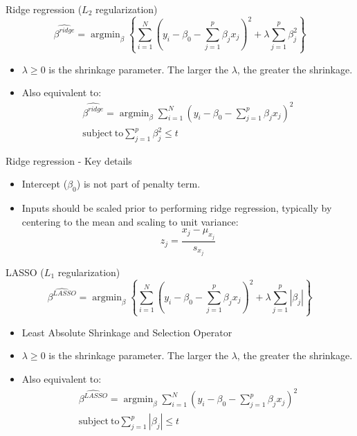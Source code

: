 \documentclass[aspectratio=169]{beamer}
\DeclareMathOperator*{\argmin}{argmin}
\begin{document}
\begin{frame}{Ridge regression ($L_2$ regularization)}
    \begin{equation*}
        \hat{\beta^{ridge}} = \argmin_\beta \left \{ \sum_{i=1}^N (y_i - \beta_0 - \sum_{j=1}^p \beta_j x_j)^2 + \lambda \sum_{j=1}^p \beta_j^2 \right \}
    \end{equation*}
    \begin{itemize}
        \item $\lambda \geq 0$ is the shrinkage parameter. The larger the $\lambda$, the greater the shrinkage.
        \item Also equivalent to:
        \begin{eqnarray*}
        \hat{\beta^{ridge}} = \argmin_\beta \sum_{i=1}^N (y_i - \beta_0 - \sum_{j=1}^p \beta_j x_j)^2\\
        \mathrm{subject~to} \sum_{j=1}^p \beta_j^2 \leq t
        \end{eqnarray*}
    \end{itemize}
\end{frame}


\begin{frame}{Ridge regression - Key details}
    \begin{itemize}
        \item Intercept ($\beta_0$) is not part of penalty term.
        \item Inputs should be scaled prior to performing ridge regression, typically by centering to the mean and scaling to unit variance:
        \begin{equation*}
            z_j = \frac{x_j - \mu_{x_j}}{s_{x_j}}
        \end{equation*}
    \end{itemize}
\end{frame} 


\begin{frame}{LASSO ($L_1$ regularization)}
    \begin{equation*}
        \hat{\beta^{LASSO}} = \argmin_\beta \left \{ \sum_{i=1}^N (y_i - \beta_0 - \sum_{j=1}^p \beta_j x_j)^2 + \lambda \sum_{j=1}^p |\beta_j| \right \}
    \end{equation*}
    \begin{itemize}
        \item Least Absolute Shrinkage and Selection Operator
        \item $\lambda \geq 0$ is the shrinkage parameter. The larger the $\lambda$, the greater the shrinkage.
        \item Also equivalent to:
        \begin{eqnarray*}
        \hat{\beta^{LASSO}} = \argmin_\beta \sum_{i=1}^N (y_i - \beta_0 - \sum_{j=1}^p \beta_j x_j)^2\\
        \mathrm{subject~to} \sum_{j=1}^p |\beta_j| \leq t
        \end{eqnarray*}
    \end{itemize}
\end{frame}
\end{document}
